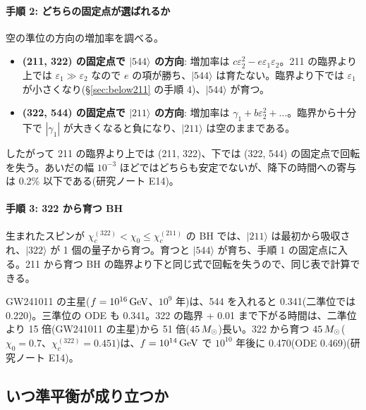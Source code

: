 \paragraph{手順 2: どちらの固定点が選ばれるか}
空の準位の方向の増加率を調べる。
\begin{itemize}
\item \textbf{(211, 322) の固定点で $|544\rangle$ の方向}: 増加率は $c\varepsilon_2^2-e\varepsilon_1\varepsilon_2$。211 の臨界より上では $\varepsilon_1\gg\varepsilon_2$ なので $e$ の項が勝ち、$|544\rangle$ は育たない。臨界より下では $\varepsilon_1$ が小さくなり(\S\ref{sec:below211} の手順 4)、$|544\rangle$ が育つ。
\item \textbf{(322, 544) の固定点で $|211\rangle$ の方向}: 増加率は $\gamma_1+b\varepsilon_2^2+\dots$。臨界から十分下で $|\gamma_1|$ が大きくなると負になり、$|211\rangle$ は空のままである。
\end{itemize}
したがって 211 の臨界より上では (211, 322)、下では (322, 544) の固定点で回転を失う。あいだの幅 $10^{-3}$ ほどではどちらも安定でないが、降下の時間への寄与は 0.2\% 以下である(研究ノート E14)。

\paragraph{手順 3: 322 から育つ BH}
生まれたスピンが $\chi_c^{(322)}<\chi_0\le\chi_c^{(211)}$ の BH では、$|211\rangle$ は最初から吸収され、$|322\rangle$ が 1 個の量子から育つ。育つと $|544\rangle$ が育ち、手順 1 の固定点に入る。211 から育つ BH の臨界より下と同じ式で回転を失うので、同じ表で計算できる。

\begin{numcheck}
GW241011 の主星($f=10^{16}\,\mathrm{GeV}$、$10^9$ 年)は、544 を入れると 0.341(二準位では 0.220)。三準位の ODE も 0.341。322 の臨界 + 0.01 まで下がる時間は、二準位より 15 倍(GW241011 の主星)から 51 倍($45\,M_\odot$)長い。322 から育つ $45\,M_\odot$($\chi_0=0.7$、$\chi_c^{(322)}=0.451$)は、$f=10^{14}\,\mathrm{GeV}$ で $10^{10}$ 年後に 0.470(ODE 0.469)(研究ノート E14)。
\end{numcheck}

\subsection{いつ準平衡が成り立つか}

